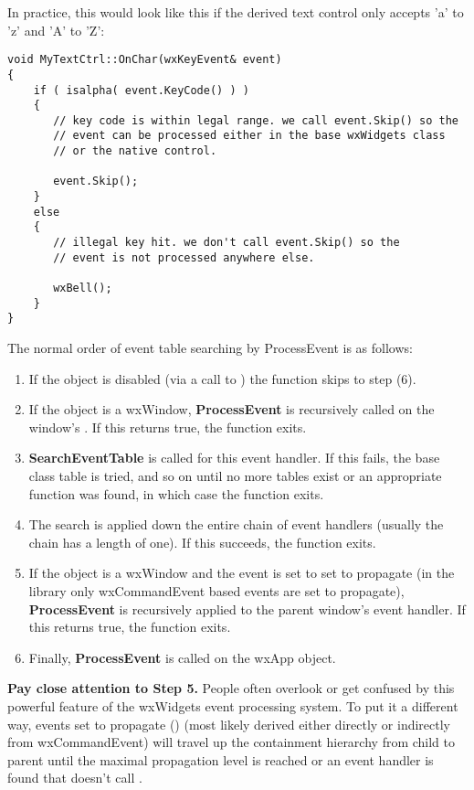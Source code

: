 In practice, this would look like this if the derived text control only
accepts 'a' to 'z' and 'A' to 'Z':

{\small%
\begin{verbatim}
void MyTextCtrl::OnChar(wxKeyEvent& event)
{
    if ( isalpha( event.KeyCode() ) )
    {
       // key code is within legal range. we call event.Skip() so the
       // event can be processed either in the base wxWidgets class
       // or the native control.

       event.Skip();
    }
    else
    {
       // illegal key hit. we don't call event.Skip() so the
       // event is not processed anywhere else.

       wxBell();
    }
}
\end{verbatim}
}%


The normal order of event table searching by ProcessEvent is as follows:

\begin{enumerate}\itemsep=0pt
\item If the object is disabled (via a call to )
the function skips to step (6).
\item If the object is a wxWindow, {\bf ProcessEvent} is recursively called on the window's\rtfsp
{}. If this returns true, the function exits.
\item {\bf SearchEventTable} is called for this event handler. If this fails, the base
class table is tried, and so on until no more tables exist or an appropriate function was found,
in which case the function exits.
\item The search is applied down the entire chain of event handlers (usually the chain has a length
of one). If this succeeds, the function exits.
\item If the object is a wxWindow and the event is set to set to propagate (in the library only
wxCommandEvent based events are set to propagate), {\bf ProcessEvent} is recursively applied
to the parent window's event handler. If this returns true, the function exits.
\item Finally, {\bf ProcessEvent} is called on the wxApp object.
\end{enumerate}

{\bf Pay close attention to Step 5.}  People often overlook or get
confused by this powerful feature of the wxWidgets event processing
system.  To put it a different way, events set to propagate 
()
(most likely derived either directly or indirectly from wxCommandEvent)
will travel up the containment hierarchy from child to parent until the 
maximal propagation level is reached or an event handler is found that
doesn't call .

